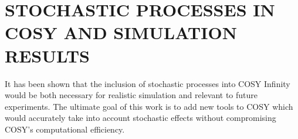 \documentclass{jacow}
\begin{document}
%
%
%


\section{STOCHASTIC PROCESSES IN COSY AND SIMULATION RESULTS}
It has been shown that the inclusion of stochastic processes into COSY Infinity would be both necessary for realistic simulation and relevant to future experiments. The ultimate goal of this work is to add new tools to COSY which would accurately take into account stochastic effects without compromising COSY's computational efficiency. 
\end{document}
